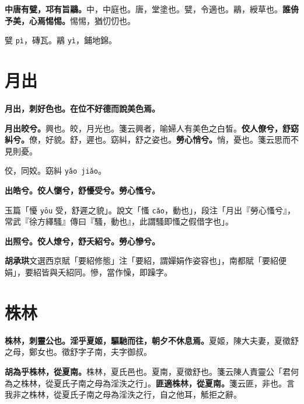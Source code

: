 \textbf{中唐有甓，邛有旨鷊。}{\footnotesize 中，中庭也。唐，堂塗也。甓，令適也。鷊，綬草也。}\textbf{誰侜予美，心焉惕惕。}{\footnotesize 惕惕，猶忉忉也。}

\begin{quoting}甓 \texttt{pì}，磚瓦。鷊 \texttt{yì}，鋪地錦。\end{quoting}

\section{月出}


\textbf{月出，刺好色也。在位不好德而說美色焉。}

\textbf{月出皎兮。}{\footnotesize 興也。皎，月光也。箋云興者，喻婦人有美色之白皙。}\textbf{佼人僚兮，舒窈糾兮。}{\footnotesize 僚，好貌。舒，遲也。窈糾，舒之姿也。}\textbf{勞心悄兮。}{\footnotesize 悄，憂也。箋云思而不見則憂。}

\begin{quoting}佼，同姣。窈糾 \texttt{yǎo jiǎo}。\end{quoting}

\textbf{出皓兮。佼人懰兮，舒懮受兮。勞心慅兮。}

\begin{quoting}玉篇「懮 \texttt{yōu} 受，舒遲之貌」。說文「慅 \texttt{cǎo}，動也」，段注「月出『勞心慅兮』，常武『徐方繹騷』傳曰『騷，動也』，此謂騷即慅之假借字也」。\end{quoting}

\textbf{出照兮。佼人燎兮，舒夭紹兮。勞心慘兮。}

\begin{quoting}\textbf{胡承珙}文選西京賦「要紹修態」注「要紹，謂嬋娟作姿容也」，南都賦「要紹便娟」，要紹皆與夭紹同。慘，當作懆，即躁字。\end{quoting}

\section{株林}


\textbf{株林，刺靈公也。淫乎夏姬，驅馳而往，朝夕不休息焉。}{\footnotesize 夏姬，陳大夫妻，夏徵舒之母，鄭女也。徵舒字子南，夫字御叔。}

\textbf{胡為乎株林，從夏南。}{\footnotesize 株林，夏氏邑也。夏南，夏徵舒也。箋云陳人責靈公「君何為之株林，從夏氏子南之母為淫泆之行」。}\textbf{匪適株林，從夏南。}{\footnotesize 箋云匪，非也。言我非之株林，從夏氏子南之母為淫泆之行，自之他耳，觝拒之辭。}

